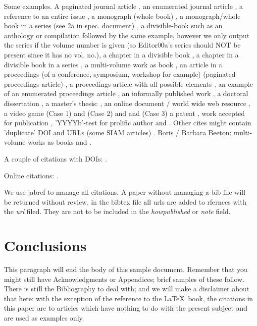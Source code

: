 \documentclass[sigconf]{acmart}
\begin{document}
Some examples.  A paginated journal article \cite{Abril07}, an
enumerated journal article \cite{Cohen07}, a reference to an entire
issue \cite{JCohen96}, a monograph (whole book) \cite{Kosiur01}, a
monograph/whole book in a series (see 2a in spec. document)
\cite{Harel79}, a divisible-book such as an anthology or compilation
\cite{Editor00} followed by the same example, however we only output
the series if the volume number is given \cite{Editor00a} (so
Editor00a's series should NOT be present since it has no vol. no.), a
chapter in a divisible book \cite{Spector90}, a chapter in a divisible
book in a series \cite{Douglass98}, a multi-volume work as book
\cite{Knuth97}, an article in a proceedings (of a conference,
symposium, workshop for example) (paginated proceedings article)
\cite{Andler79}, a proceedings article with all possible elements
\cite{Smith10}, an example of an enumerated proceedings article
\cite{VanGundy07}, an informally published work \cite{Harel78}, a
doctoral dissertation \cite{Clarkson85}, a master's thesis:
\cite{anisi03}, an online document / world wide web resource
\cite{Thornburg01, Ablamowicz07, Poker06}, a video game (Case 1)
\cite{Obama08} and (Case 2) \cite{Novak03} and \cite{Lee05} and (Case
3) a patent \cite{JoeScientist001}, work accepted for publication
\cite{rous08}, 'YYYYb'-test for prolific author \cite{SaeediMEJ10} and
\cite{SaeediJETC10}. Other cites might contain 'duplicate' DOI and
URLs (some SIAM articles) \cite{Kirschmer:2010:AEI:1958016.1958018}.
Boris / Barbara Beeton: multi-volume works as books \cite{MR781536}
and \cite{MR781537}.

A couple of citations with DOIs: \cite{2004:ITE:1009386.1010128,
  Kirschmer:2010:AEI:1958016.1958018}.

Online citations: \cite{TUGInstmem, Thornburg01, CTANacmart}.  

We use jabref to manage all citations. A paper without managing a bib
file will be returned without review. in the bibtex file all urls are
added to rfernces with the {\it url} filed. They are not to be
included in the {\it howpublished} or {\it note} field. 

\section{Conclusions}

This paragraph will end the body of this sample document.  Remember
that you might still have Acknowledgments or Appendices; brief samples
of these follow.  There is still the Bibliography to deal with; and we
will make a disclaimer about that here: with the exception of the
reference to the \LaTeX\ book, the citations in this paper are to
articles which have nothing to do with the present subject and are
used as examples only.
\end{document}
